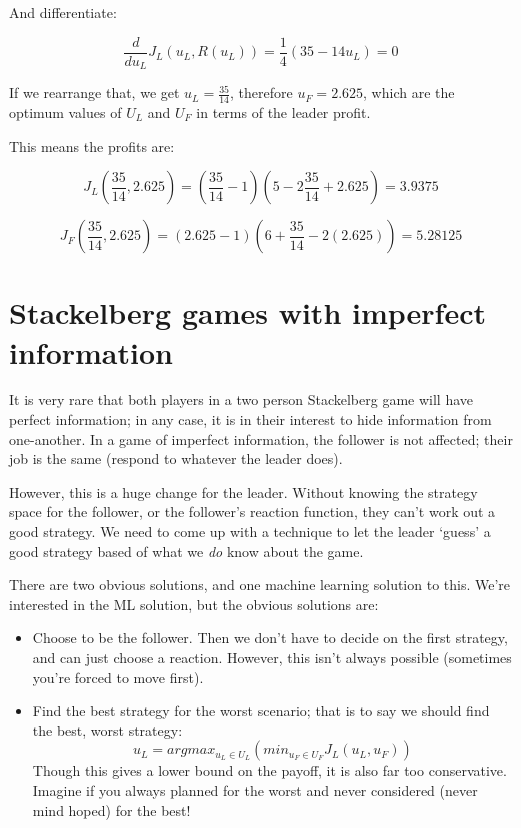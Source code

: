 And differentiate:

\[
  \frac{d}{du_L}J_L(u_L, R(u_L)) = \frac{1}{4}(35 - 14u_L) = 0
\]

If we rearrange that, we get $u_L = \frac{35}{14}$, therefore $u_F =
2.625$, which are the optimum values of $U_L$ and $U_F$ in terms of
the leader profit.

This means the profits are:

\[
  J_L(\frac{35}{14}, 2.625) = (\frac{35}{14} - 1)(5 - 2\frac{35}{14} + 2.625) = 3.9375
\]

\[
  J_F(\frac{35}{14}, 2.625) = (2.625 - 1)(6 + \frac{35}{14} - 2(2.625)) = 5.28125
\]


\section{Stackelberg games with imperfect information}

It is very rare that both players in a two person Stackelberg game will have
perfect information; in any case, it is in their interest to hide information
from one-another. In a game of imperfect information, the follower is not
affected; their job is the same (respond to whatever the leader does).

However, this is a huge change for the leader. Without knowing the strategy
space for the follower, or the follower's reaction function, they can't work out
a good strategy. We need to come up with a technique to let the leader `guess' a
good strategy based of what we \textit{do} know about the game.

There are two obvious solutions, and one machine learning solution to this.
We're interested in the ML solution, but the obvious solutions are:

\begin{itemize}
  \item Choose to be the follower. Then we don't have to decide on the first
  strategy, and can just choose a reaction. However, this isn't always possible
  (sometimes you're forced to move first).
  \item Find the best strategy for the worst scenario; that is to say we should
  find the best, worst strategy:
  \[
    u_L = arg max_{u_L \in U_L}(min_{u_F \in U_F}J_L(u_L, u_F))
  \]
  Though this gives a lower bound on the payoff, it is also far too
  conservative. Imagine if you always planned for the worst and never considered
  (never mind hoped) for the best!
\end{itemize}

